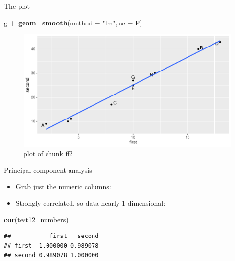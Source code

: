 \documentclass[ignorenonframetext,]{beamer}
\newenvironment{Shaded}{\begin{snugshade}}{\end{snugshade}}
\newcommand{\DataTypeTok}[1]{\textcolor[rgb]{0.13,0.29,0.53}{#1}}
\newcommand{\KeywordTok}[1]{\textcolor[rgb]{0.13,0.29,0.53}{\textbf{#1}}}
\newcommand{\NormalTok}[1]{#1}
\newcommand{\OperatorTok}[1]{\textcolor[rgb]{0.81,0.36,0.00}{\textbf{#1}}}
\newcommand{\StringTok}[1]{\textcolor[rgb]{0.31,0.60,0.02}{#1}}
\providecommand{\tightlist}{%
  \setlength{\itemsep}{0pt}\setlength{\parskip}{0pt}}
\begin{document}
\begin{frame}[fragile]{The plot}
\protect\hypertarget{the-plot-8}{}

\begin{Shaded}
\begin{Highlighting}[]
\NormalTok{g }\OperatorTok{+}\StringTok{ }\KeywordTok{geom_smooth}\NormalTok{(}\DataTypeTok{method =} \StringTok{"lm"}\NormalTok{, }\DataTypeTok{se =}\NormalTok{ F)}
\end{Highlighting}
\end{Shaded}

\begin{figure}
\centering
\includegraphics{figure/ff2-1.pdf}
\caption{plot of chunk ff2}
\end{figure}

\end{frame}

\begin{frame}[fragile]{Principal component analysis}
\protect\hypertarget{principal-component-analysis}{}

\begin{itemize}
\tightlist
\item
  Grab just the numeric columns:
\end{itemize}

\begin{Shaded}
\end{Shaded}

\begin{itemize}
\tightlist
\item
  Strongly correlated, so data nearly 1-dimensional:
\end{itemize}

\begin{Shaded}
\begin{Highlighting}[]
\KeywordTok{cor}\NormalTok{(test12_numbers)}
\end{Highlighting}
\end{Shaded}

\begin{verbatim}
##           first   second
## first  1.000000 0.989078
## second 0.989078 1.000000
\end{verbatim}

\end{frame}
\end{document}
